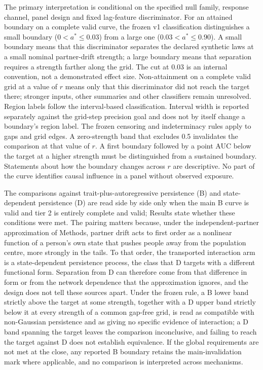 The primary interpretation is conditional on the specified null family, response channel, panel design and fixed lag-feature discriminator. For an attained boundary on a complete valid curve, the frozen v1 classification distinguishes a small boundary ($0<a^*\le0.03$) from a large one ($0.03<a^*\le0.90$). A small boundary means that this discriminator separates the declared synthetic laws at a small nominal partner-drift strength; a large boundary means that separation requires a strength farther along the grid. The cut at 0.03 is an internal convention, not a demonstrated effect size. Non-attainment on a complete valid grid at a value of $r$ means only that this discriminator did not reach the target there; stronger inputs, other summaries and other classifiers remain unresolved. Region labels follow the interval-based classification. Interval width is reported separately against the grid-step precision goal and does not by itself change a boundary's region label. The frozen censoring and indeterminacy rules apply to gaps and grid edges. A zero-strength band that excludes 0.5 invalidates the comparison at that value of $r$. A first boundary followed by a point AUC below the target at a higher strength must be distinguished from a sustained boundary. Statements about how the boundary changes across $r$ are descriptive. No part of the curve identifies causal influence in a panel without observed exposure.

The comparisons against trait-plus-autoregressive persistence (B) and state-dependent persistence (D) are read side by side only when the main B curve is valid and tier 2 is entirely complete and valid; Results state whether these conditions were met. The pairing matters because, under the independent-partner approximation of Methods, partner drift acts to first order as a nonlinear function of a person's own state that pushes people away from the population centre, more strongly in the tails. To that order, the transported interaction arm is a state-dependent persistence process, the class that D targets with a different functional form. Separation from D can therefore come from that difference in form or from the network dependence that the approximation ignores, and the design does not tell these sources apart. Under the frozen rule, a B lower band strictly above the target at some strength, together with a D upper band strictly below it at every strength of a common gap-free grid, is read as compatible with non-Gaussian persistence and as giving no specific evidence of interaction; a D band spanning the target leaves the comparison inconclusive, and failing to reach the target against D does not establish equivalence. If the global requirements are not met at the close, any reported B boundary retains the main-invalidation mark where applicable, and no comparison is interpreted across mechanisms.

